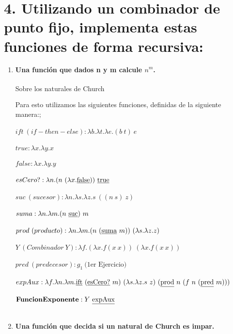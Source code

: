 \documentclass[11pt, a4paper]{report}
\begin{document}
  \section*{4. Utilizando un combinador de punto fijo, implementa estas funciones de forma recursiva:}
  \begin{enumerate}[label=\alph*)]
    \item \textbf{Una función que dados n y m calcule $ n^{m} $.}\\\\
      Sobre los naturales de Church
      
      Para esto utilizamos las siguientes funciones, definidas de la siguiente manera:; \\\\
    $ ift\ (if-then-else): \lambda b.\lambda t.\lambda e.(b\ t)\ e $\\\\
    $ true: \lambda x.\lambda y.x $ \\\\
    $ false: \lambda x.\lambda y.y $ \\\\
    $ esCero?: \lambda n.(n\ (\lambda x.\text{\underline{false}}))\ \text{\underline{true}}$\\\\
    $ suc\ (sucesor): \lambda n.\lambda s.\lambda z.s\ ((n\ s)\ z) $\\\\
    $ suma: \lambda n.\lambda m.(n\ \text{\underline{suc}})\ m $\\\\
    $ prod\ (producto): \lambda n.\lambda m.(n\ (\text{\underline{suma}}\ m))\ (\lambda s.\lambda z.z) $\\\\
    $ Y\ (Combinador\ Y): \lambda f.(\lambda x.f(x\ x))\ (\lambda x.f(x\ x)) $\\\\
    $ pred\ (predecesor): g_{1}\ \text{(1er Ejercicio)}$\\\\
	$ expAux: \lambda f.\lambda n.\lambda m.\text{\underline{ift}}\ (\text{\underline{esCero?}}\ m)\ (\lambda s.\lambda z.s\ z)\ (\text{\underline{prod}}\ n\ (f\ n\ (\text{\underline{pred}}\ m)))  $\\\\
    $ \text{\textbf{FuncionExponente}}: Y\ \text{\underline{expAux}} $\\\\
    \item \textbf{Una función que decida si un natural de Church es impar.}\\\\

\end{enumerate}
\end{document}
